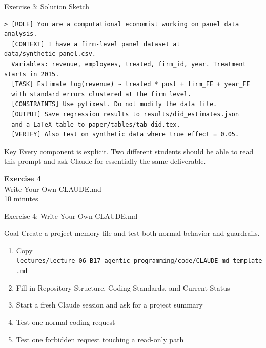 \documentclass[aspectratio=169,10pt]{beamer}
\begin{document}
\begin{frame}[fragile]{Exercise 3: Solution Sketch}
\scriptsize
\begin{lstlisting}[style=prompt, basicstyle=\tiny\ttfamily]
> [ROLE] You are a computational economist working on panel data analysis.
  [CONTEXT] I have a firm-level panel dataset at data/synthetic_panel.csv.
  Variables: revenue, employees, treated, firm_id, year. Treatment starts in 2015.
  [TASK] Estimate log(revenue) ~ treated * post + firm_FE + year_FE
  with standard errors clustered at the firm level.
  [CONSTRAINTS] Use pyfixest. Do not modify the data file.
  [OUTPUT] Save regression results to results/did_estimates.json
  and a LaTeX table to paper/tables/tab_did.tex.
  [VERIFY] Also test on synthetic data where true effect = 0.05.
\end{lstlisting}

\begin{block}{Key}
Every component is explicit. Two different students should be able to read this
prompt and ask Claude for essentially the same deliverable.
\end{block}
\end{frame}

\begin{frame}{}
\vfill\begin{center}{\Huge \textcolor{uzhblue}{\textbf{Exercise 4}}}\\[12pt]
{\LARGE Write Your Own CLAUDE.md}\\[6pt]{\small 10 minutes}\end{center}\vfill
\end{frame}

\begin{frame}[fragile]{Exercise 4: Write Your Own CLAUDE.md}
\begin{exampleblock}{Goal}
Create a project memory file and test both normal behavior and guardrails.
\end{exampleblock}
\small
\begin{enumerate}\itemsep2pt
    \item Copy \texttt{lectures/lecture\_06\_B17\_agentic\_programming/code/CLAUDE\_md\_template.md}
    \item Fill in Repository Structure, Coding Standards, and Current Status
    \item Start a fresh Claude session and ask for a project summary
    \item Test one normal coding request
    \item Test one forbidden request touching a read-only path
\end{enumerate}
\end{frame}
\end{document}
